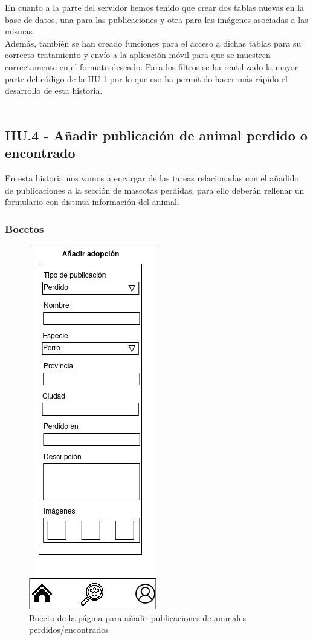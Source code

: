 En cuanto a la parte del servidor hemos tenido que crear dos tablas nuevas en la base de datos, una para las publicaciones y otra para las imágenes asociadas a las mismas.\\

Además, también se han creado funciones para el acceso a dichas tablas para su correcto tratamiento y envío a la aplicación móvil para que se muestren correctamente en el formato deseado. Para los filtros se ha reutilizado la mayor parte del código de la HU.1 por lo que eso ha permitido hacer más rápido el desarrollo de esta historia.\\ \\

\subsection{HU.4 - Añadir publicación de animal perdido o encontrado}

En esta historia nos vamos a encargar de las tareas relacionadas con el añadido de publicaciones a la sección de mascotas perdidas, para ello deberán rellenar un formulario con distinta información del animal. \\
\subsubsection{Bocetos}
\begin{figure}[H]
	\centering
	\includegraphics[width=0.31\linewidth]{"sprint 2/hu4/postearPerdido"}
	\caption{Boceto de la página para añadir publicaciones de animales perdidos/encontrados}
	\label{fig:postearperdido}
\end{figure}

